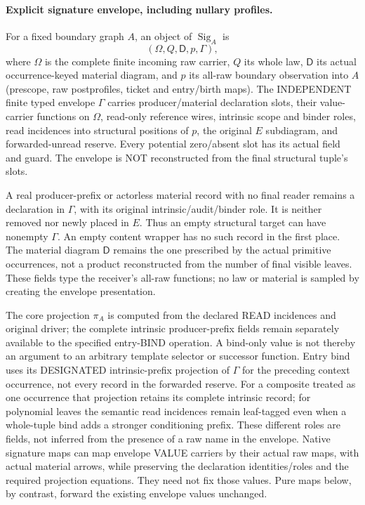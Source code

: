 \documentclass[11pt]{article}
\begin{document}
\paragraph{Explicit signature envelope, including nullary profiles.}
For a fixed boundary graph $A$, an object of $\operatorname{Sig}_A$ is
\[
       (\Omega,Q,\mathsf D,p,\Gamma),                     \tag{0}
\]
where $\Omega$ is the complete finite incoming raw carrier, $Q$ its whole law, $\mathsf D$ its actual occurrence-keyed material diagram, and $p$ its all-raw boundary observation into $A$ (prescope, raw postprofiles, ticket and entry/birth maps). The INDEPENDENT finite typed envelope $\Gamma$ carries producer/material declaration slots, their value-carrier functions on $\Omega$, read-only reference wires, intrinsic scope and binder roles, read incidences into structural positions of $p$, the original $E$ subdiagram, and forwarded-unread reserve. Every potential zero/absent slot has its actual field and guard. The envelope is NOT reconstructed from the final structural tuple's slots.

A real producer-prefix or actorless material record with no final reader remains a declaration in $\Gamma$, with its original intrinsic/audit/binder role. It is neither removed nor newly placed in $E$. Thus an empty structural target can have nonempty $\Gamma$. An empty content wrapper has no such record in the first place. The material diagram $\mathsf D$ remains the one prescribed by the actual primitive occurrences, not a product reconstructed from the number of final visible leaves. These fields type the receiver's all-raw functions; no law or material is sampled by creating the envelope presentation.

The core projection $\pi_A$ is computed from the declared READ incidences and original driver; the complete intrinsic producer-prefix fields remain separately available to the specified entry-BIND operation. A bind-only value is not thereby an argument to an arbitrary template selector or successor function. Entry bind uses its DESIGNATED intrinsic-prefix projection of $\Gamma$ for the preceding context occurrence, not every record in the forwarded reserve. For a composite treated as one occurrence that projection retains its complete intrinsic record; for polynomial leaves the semantic read incidences remain leaf-tagged even when a whole-tuple bind adds a stronger conditioning prefix. These different roles are fields, not inferred from the presence of a raw name in the envelope. Native signature maps can map envelope VALUE carriers by their actual raw maps, with actual material arrows, while preserving the declaration identities/roles and the required projection equations. They need not fix those values. Pure maps below, by contrast, forward the existing envelope values unchanged.
\end{document}
